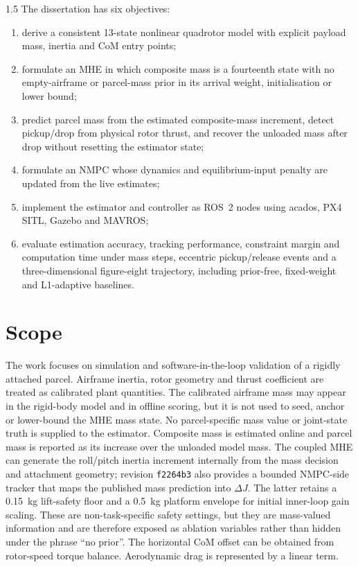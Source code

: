 \begin{spacing}{1.5}
The dissertation has six objectives:
\begin{enumerate}
    \item derive a consistent 13-state nonlinear quadrotor model with explicit payload mass, inertia and CoM entry points;
    \item formulate an MHE in which composite mass is a fourteenth state with no empty-airframe or parcel-mass prior in its arrival weight, initialisation or lower bound;
    \item predict parcel mass from the estimated composite-mass increment, detect pickup/drop from physical rotor thrust, and recover the unloaded mass after drop without resetting the estimator state;
    \item formulate an NMPC whose dynamics and equilibrium-input penalty are updated from the live estimates;
    \item implement the estimator and controller as ROS~2 nodes using acados, PX4 SITL, Gazebo and MAVROS;
    \item evaluate estimation accuracy, tracking performance, constraint margin and computation time under mass steps, eccentric pickup/release events and a three-dimensional figure-eight trajectory, including prior-free, fixed-weight and L1-adaptive baselines.
\end{enumerate}

\section{Scope}

The work focuses on simulation and software-in-the-loop validation of a rigidly attached parcel. Airframe inertia, rotor geometry and thrust coefficient are treated as calibrated plant quantities. The calibrated airframe mass may appear in the rigid-body model and in offline scoring, but it is not used to seed, anchor or lower-bound the MHE mass state. No parcel-specific mass value or joint-state truth is supplied to the estimator. Composite mass is estimated online and parcel mass is reported as its increase over the unloaded model mass. The coupled MHE can generate the roll/pitch inertia increment internally from the mass decision and attachment geometry; revision \texttt{f2264b3} also provides a bounded NMPC-side tracker that maps the published mass prediction into $\Delta J$. The latter retains a \SI{0.15}{kg} lift-safety floor and a \SI{0.5}{kg} platform envelope for initial inner-loop gain scaling. These are non-task-specific safety settings, but they are mass-valued information and are therefore exposed as ablation variables rather than hidden under the phrase ``no prior''. The horizontal CoM offset can be obtained from rotor-speed torque balance. Aerodynamic drag is represented by a linear term.


\end{spacing}
